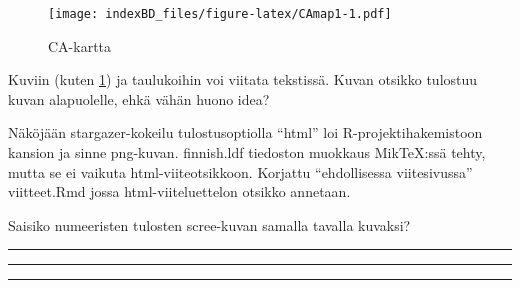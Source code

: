 \documentclass[finnish,]{book}
\theoremstyle{definition}
\theoremstyle{definition}
\theoremstyle{definition}
\theoremstyle{remark}
\begin{document}
\begin{figure}
\centering
\texttt{[image: indexBD\_files/figure-latex/CAmap1-1.pdf]}
\caption{\label{fig:CAmap1}CA-kartta}
\end{figure}

Kuviin (kuten \ref{fig:CAmap1}) ja taulukoihin voi viitata tekstissä.
Kuvan otsikko tulostuu kuvan alapuolelle, ehkä vähän huono idea?

Näköjään stargazer-kokeilu tulostusoptiolla ``html'' loi
R-projektihakemistoon kansion ja sinne png-kuvan. finnish.ldf tiedoston
muokkaus MikTeX:ssä tehty, mutta se ei vaikuta html-viiteotsikkoon.
Korjattu ``ehdollisessa viitesivussa'' viitteet.Rmd jossa
html-viiteluettelon otsikko annetaan.

Saisiko numeeristen tulosten scree-kuvan samalla tavalla kuvaksi?

\begin{center}\rule{0.5\linewidth}{\linethickness}\end{center}

\begin{center}\rule{0.5\linewidth}{\linethickness}\end{center}

\begin{center}\rule{0.5\linewidth}{\linethickness}\end{center}


\end{document}
